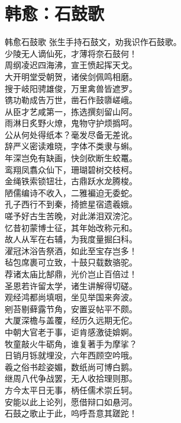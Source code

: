 \documentclass[12pt,oneside,a5paper]{book}
\begin{document}
\chapter{韩愈：石鼓歌}
\begin{poemzh}{韩愈}{石鼓歌}
张生手持石鼓文，劝我识作石鼓歌。\\
少陵无人谪仙死，才薄将奈石鼓何！\\
周纲凌迟四海沸，宣王愤起挥天戈。\\
大开明堂受朝贺，诸侯剑佩鸣相磨。\\
搜于岐阳骋雄俊，万里禽兽皆遮罗。\\
镌功勒成告万世，凿石作鼓隳嵯峨。\\
从臣才艺咸第一，拣选撰刻留山阿。\\
雨淋日炙野火燎，鬼物守护烦撝呵。\\
公从何处得纸本？毫发尽备无差讹。\\
辞严义密读难晓，字体不类隶与蝌。\\
年深岂免有缺画，快剑砍断生蛟鼍。\\
鸾翔凤翥众仙下，珊瑚碧树交枝柯。\\
金绳铁索锁钮壮，古鼎跃水龙腾梭。\\
陋儒编诗不收入，二雅褊迫无委蛇。\\
孔子西行不到秦，掎摭星宿遗羲娥。\\
嗟予好古生苦晚，对此涕泪双滂沱。\\
忆昔初蒙博士征，其年始改称元和。\\
故人从军在右辅，为我度量掘臼科。\\
濯冠沐浴告祭酒，如此至宝存岂多！\\
毡包席裹可立致，十鼓只载数骆驼。\\
荐诸太庙比郜鼎，光价岂止百倍过！\\
圣恩若许留太学，诸生讲解得切磋。\\
观经鸿都尚填咽，坐见举国来奔波。\\
剜苔剔藓露节角，安置妥帖平不颇。\\
大厦深檐与盖覆，经历久远期无佗。\\
中朝大官老于事，讵肯感激徒媕婀。\\
牧童敲火牛砺角，谁复著手为摩挲？\\
日销月铄就埋没，六年西顾空吟哦。\\
羲之俗书趁姿媚，数纸尚可博白鹅。\\
继周八代争战罢，无人收拾理则那。\\
方今太平日无事，柄任儒术崇丘轲。\\
安能以此上论列，愿借辩口如悬河。\\
石鼓之歌止于此，呜呼吾意其蹉跎！\\ 
\end{poemzh}
\end{document}
